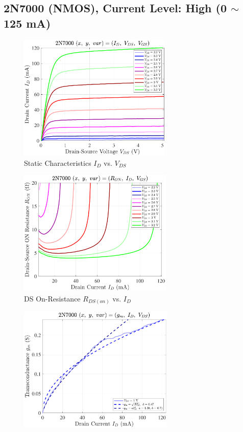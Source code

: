 \documentclass[UTF8]{article}
\begin{document}
\newpage
\subsection{2N7000 (NMOS), Current Level: High (0 $\sim$ 125 mA)}


\begin{center}
    \noindent\begin{minipage}{0.45\columnwidth}
        \begin{figure}[H]\centering
            \includegraphics[height=170pt]{LCE-04-场效应管/assets/2N7000 (NMOS) [onsemi, KH32] current level high/2025-04-24_00-52-18__stc_Id_Vds_Vgs.pdf}
            \caption{Static Characteristics $I_D$ vs. $V_{DS}$}
        \end{figure}
        \begin{figure}[H]\centering
            \includegraphics[height=170pt]{LCE-04-场效应管/assets/2N7000 (NMOS) [onsemi, KH32] current level high/2025-04-24_00-52-28__stc_Ron_Id_Vgs.pdf}
            \caption{DS On-Resistance $R_{DS(on)}$ vs. $I_D$}
        \end{figure}
        \begin{figure}[H]\centering
            \includegraphics[height=170pt]{LCE-04-场效应管/assets/2N7000 (NMOS) [onsemi, KH32] current level high/2025-04-24_00-52-33__stc_gm_Id_Vds.pdf}

\end{figure}
\end{minipage}
\end{center}
\end{document}
